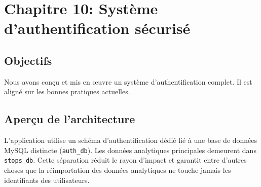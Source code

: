 \chapter{Chapitre 10: Système d'authentification sécurisé}\label{chap:auth}

\section{Objectifs}
Nous avons conçu et mis en œuvre un système d'authentification complet. Il est aligné sur les bonnes pratiques actuelles.

\section{Aperçu de l'architecture}
L'application utilise un schéma d'authentification dédié lié à une base de données MySQL distincte (\texttt{auth\_db}). Les données analytiques principales demeurent dans \texttt{stops\_db}. Cette séparation réduit le rayon d'impact et garantit entre d'autres choses que la réimportation des données analytiques ne touche jamais les identifiants des utilisateurs.

